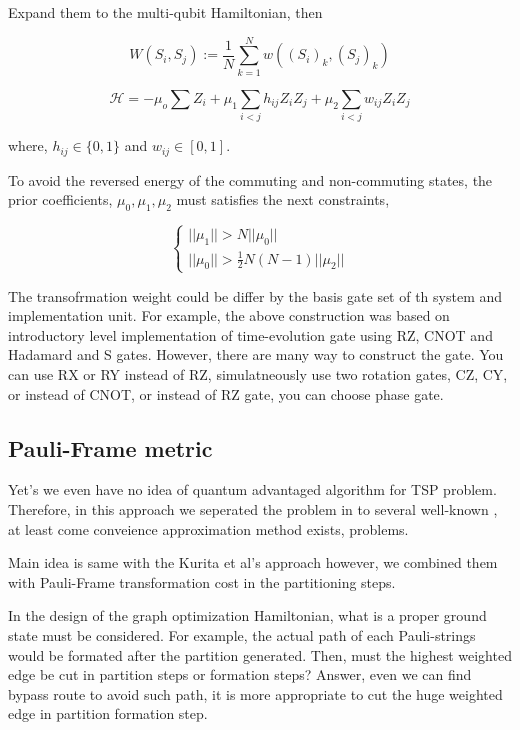 Expand them to the multi-qubit Hamiltonian, then 

\begin{equation}
    W(S_i, S_j) := \frac{1}{N} \sum_{k=1}^N w((S_i)_k, (S_j)_k) 
\end{equation}


\begin{equation}
    \mathcal{H} = - \mu_o \sum  Z_i + \mu_1 \sum_{i <j} h_{ij} Z_iZ_j + \mu_2 \sum_{i<j} w_{ij} Z_i Z_j
\end{equation}

where, $h_{ij} \in \{0, 1\}$ and $w_{ij} \in [0, 1]$.

To avoid the reversed energy of the commuting and non-commuting 
states, the prior coefficients, $\mu_0, \mu_1, \mu_2$ must satisfies the next constraints,

\begin{equation}
    \begin{cases}
        || \mu_1 || > N || \mu_0|| \\
        || \mu_0 ||  > \frac{1}{2} N (N-1) || \mu_2||
    \end{cases}
\end{equation}

The transofrmation weight could be differ by the 
basis gate set of th system and implementation unit.
For example, the above construction was based on 
introductory level implementation of time-evolution gate
using RZ, CNOT and Hadamard and S gates. 
However, there are many way to construct the gate.
You can use RX or RY instead of RZ,
simulatneously use two rotation gates,
CZ, CY, or instead of CNOT, or
instead of RZ gate, you can choose phase gate.

\subsection{Pauli-Frame metric}



Yet's we even have no idea of quantum advantaged algorithm for TSP problem.
Therefore, in this approach we seperated the problem in to several well-known
, at least come conveience approximation method exists,
problems.

Main idea is same with the Kurita et al's approach however, we combined them with Pauli-Frame 
transformation cost in the partitioning steps.


In the design of the graph optimization Hamiltonian, what is a proper ground state must be considered.
For example, the actual path of each Pauli-strings would be formated after the partition generated.
Then, must the highest weighted edge be cut in partition steps or formation steps?
Answer, even we can find bypass route to avoid such path, it is more appropriate to cut the huge weighted edge
in partition formation step. %


